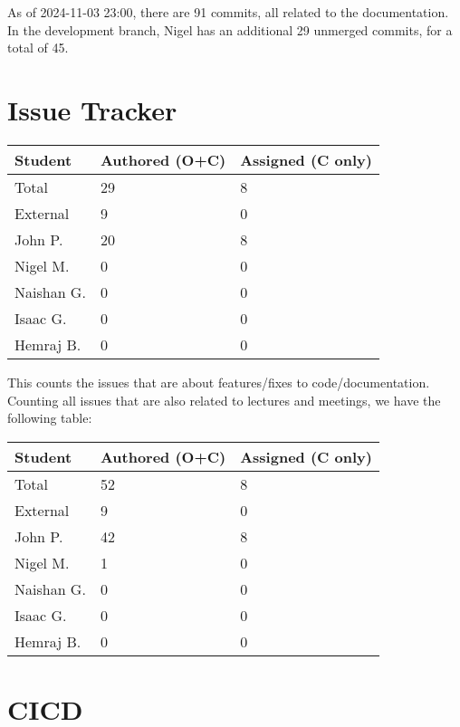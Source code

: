 \documentclass{article}
\begin{document}
As of 2024-11-03 23:00, there are 91 commits, all related to the documentation. In the development branch, Nigel has an additional 29 unmerged commits, for a total of 45.

\section{Issue Tracker}


\begin{table}[H]
\centering
\begin{tabular}{lll}
\toprule
\textbf{Student} & \textbf{Authored (O+C)} & \textbf{Assigned (C only)}\\
\midrule
Total & 29 & 8 \\
External & 9 & 0 \\
John P. & 20 & 8 \\
Nigel M. & 0 & 0 \\
Naishan G. & 0 & 0 \\
Isaac G. & 0 & 0 \\
Hemraj B. & 0 & 0 \\
\bottomrule
\end{tabular}
\end{table}


This counts the issues that are about features/fixes to code/documentation. Counting all issues that are also related to lectures and meetings, we have the following table:

\begin{table}[H]
\centering
\begin{tabular}{lll}
\toprule
\textbf{Student} & \textbf{Authored (O+C)} & \textbf{Assigned (C only)}\\
\midrule
Total & 52 & 8 \\
External & 9 & 0 \\
John P. & 42 & 8 \\
Nigel M. & 1 & 0 \\
Naishan G. & 0 & 0 \\
Isaac G. & 0 & 0 \\
Hemraj B. & 0 & 0 \\
\bottomrule
\end{tabular}
\end{table}



\section{CICD}


\end{document}

